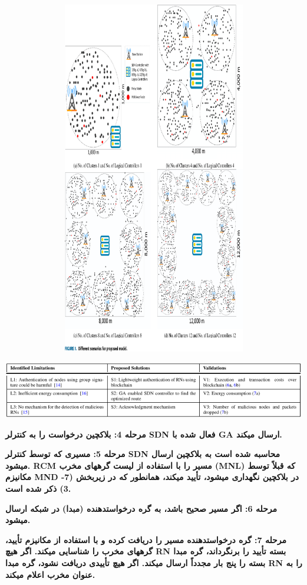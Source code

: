 \documentclass{article} %
\begin{document}
{\bf  \includegraphics*[width=6.70in, height=6.13in]{image3}\includegraphics*[width=6.69in, height=1.26in]{image4}مرحله 4: بلاکچین درخواست را به کنترلر SDN فعال شده با GA ارسال میکند.}


{\bf  مرحله 5: مسیری که توسط کنترلر SDN محاسبه شده است به بلاکچین ارسال میشود. RCM مسیر را با استفاده از لیست گرههای مخرب (MNL) که قبلاً توسط مکانیزم MND در بلاکچین نگهداری میشود، تأیید میکند، همانطور که در زیربخش (7-3) ذکر شده است.}


{\bf  مرحله 6: اگر مسیر صحیح باشد، به گره درخواستدهنده (مبدا) در شبکه ارسال میشود.}


{\bf  مرحله 7: گره درخواستدهنده مسیر را دریافت کرده و با استفاده از مکانیزم تأیید، گرههای مخرب را شناسایی میکند. اگر هیچ RN بسته تأیید را برنگرداند، گره مبدا بسته را پنج بار مجدداً ارسال میکند. اگر هیچ تأییدی دریافت نشود، گره مبدا RN را به عنوان مخرب اعلام میکند.}
\end{document}
